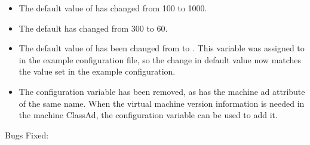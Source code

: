 \begin{itemize}
\item The default value of
   has
  changed from 100 to 1000.

\item The default  has changed from 300 to 60.

\item The default value of  has been
  changed from  to .  This variable
  was assigned to  in the example configuration file, so
  the change in default value now matches the value set in the example
  configuration.

\item The configuration variable  has been removed,
as has the machine ad attribute of the same name.
When the virtual machine version information is needed in the machine ClassAd,
the configuration variable  can be used to
add it.

\end{itemize}

\noindent Bugs Fixed:

